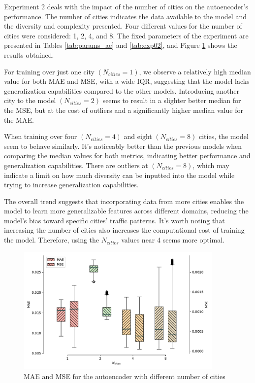 Experiment 2 deals with the impact of the number of cities on the autoencoder's performance. The number of cities indicates the data available to the model and the diversity and complexity presented. Four different values for the number of cities were considered: 1, 2, 4, and 8. The fixed parameters of the experiment are presented in Tables \ref{tab:params_ae} and \ref{tab:exp02}, and Figure \ref{fig:exp02boxplot} shows the results obtained.

For training over just one city $(N_{cities}=1)$, we observe a relatively high median value for both \gls{MAE} and \gls{MSE}, with a wide \gls{IQR}, suggesting that the model lacks generalization capabilities compared to the other models. Introducing another city to the model $(N_{cities}=2)$ seems to result in a slighter better median for the \gls{MSE}, but at the cost of outliers and a significantly higher median value for the \gls{MAE}. 

When training over four $(N_{cities}=4)$ and eight $(N_{cities}=8)$ cities, the model seem to behave similarly. It's noticeably better than the previous models when comparing the median values for both metrics, indicating better performance and generalization capabilities. There are outliers at $(N_{cities}=8)$, which may indicate a limit on how much diversity can be inputted into the model while trying to increase generalization capabilities.

The overall trend suggests that incorporating data from more cities enables the model to learn more generalizable features across different domains, reducing the model's bias toward specific cities' traffic patterns. It's worth noting that increasing the number of cities also increases the computational cost of training the model. Therefore, using the $N_{cities}$ values near 4 seems more optimal.

\begin{figure}[!ht]
\noindent\hspace{0.5mm}\includegraphics[width=0.9\textwidth]{./figures/exp02/boxplot.pdf}
\caption{\gls{MAE} and \gls{MSE} for the autoencoder with different number of cities}
\label{fig:exp02boxplot}
\end{figure}


